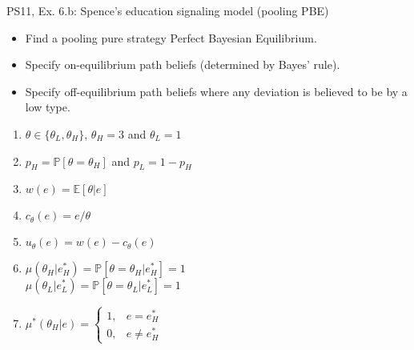 \begin{frame}{PS11, Ex. 6.b: Spence’s education signaling model (pooling PBE)}
    \begin{itemize}
      \item[(b)] Find a pooling pure strategy Perfect Bayesian Equilibrium.
    \end{itemize}\vspace{-8pt}
    \begin{multicols}{2}
      \begin{itemize}
        \item[Step 1:] Specify on-equilibrium path beliefs (determined by Bayes' rule).
        \item[Step 2:] Specify off-equilibrium path beliefs where any deviation is believed to be by a low type.
      \end{itemize}
      \vfill\null\columnbreak
      \begin{enumerate}
        \item[Types:] $\theta\in\{\theta_L,\theta_H\}$, $\theta_H=3$ and $\theta_L=1$
        \item[Prob.:] $p_H=\mathbb{P}[\theta=\theta_H]$ and $p_L=1-p_H$
        \item[Wage:] $w(e)=\mathbb{E}[\theta|e]$
        \item[Cost:] $c_\theta(e)=e/\theta$
        \item[Utility:] $u_\theta(e)=w(e)-c_\theta(e)$
        \item $\mu\left(\theta_H|e_H^*\right)=
               \mathbb{P}\left[\theta=\theta_H|e_H^*\right]=1$\\
              $\mu\left(\theta_L|e_L^*\right)=
               \mathbb{P}\left[\theta=\theta_L|e_L^*\right]=1$
        \item $\mu^*(\theta_H|e)=\left\{\begin{array}{ll}
                  1, & e = e_H^* \\
                  0, & e \neq e_H^*
               \end{array}\right.$
      \end{enumerate}
    \end{multicols}
    \vfill\null
\end{frame}

